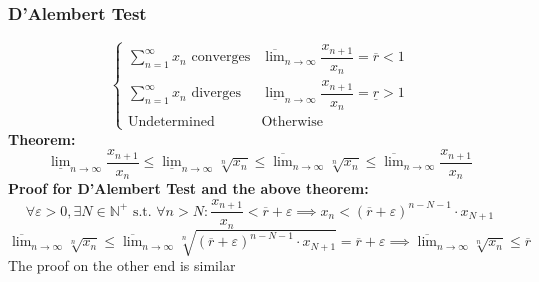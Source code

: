 \documentclass{article}
\newcommand{\st}{\mbox{ s.t. }}
\newcommand{\0}{{\bf{0}}}
\begin{document}
\subsubsection{D'Alembert Test}
$$\begin{cases}
    \sum\limits_{n=1}^\infty x_n\mbox{ converges}&\overline{\lim}_{n\to\infty}\dfrac{x_{n+1}}{x_n}=\overline{r}<1\\
    \sum\limits_{n=1}^\infty x_n\mbox{ diverges}&\underline{\lim}_{n\to\infty}\dfrac{x_{n+1}}{x_n}=\underline{r}>1\\
    \mbox{Undetermined}&\mbox{Otherwise}
\end{cases}$$
\textbf{Theorem:}
$$\underline{\lim}_{n\to\infty}\frac{x_{n+1}}{x_n}\le\underline{\lim}_{n\to\infty}\sqrt[n]{x_n}\le\overline{\lim}_{n\to\infty}\sqrt[n]{x_n}\le\overline{\lim}_{n\to\infty}\frac{x_{n+1}}{x_n}$$
\textbf{Proof for D'Alembert Test and the above theorem:}
$$\forall\varepsilon>0,\exists N\in\mathbb{N}^+\st\forall n>N:\frac{x_{n+1}}{x_n}<\overline{r}+\varepsilon\implies x_n<(\overline{r}+\varepsilon)^{n-N-1}\cdot x_{N+1}$$
$$\overline{\lim}_{n\to\infty}\sqrt[n]{x_n}\le\overline{\lim}_{n\to\infty}\sqrt[n]{(\overline{r}+\varepsilon)^{n-N-1}\cdot x_{N+1}}=\overline{r}+\varepsilon\implies\overline{\lim}_{n\to\infty}\sqrt[n]{x_n}\le\overline{r}$$
\null\hfill{The proof on the other end is similar}
\end{document}

